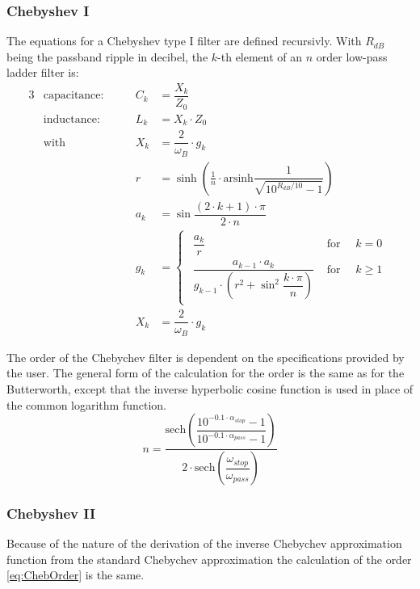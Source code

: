 \subsubsection{Chebyshev I}

The equations for a Chebyshev type I filter are defined recursivly.
With $R_{dB}$ being the passband ripple in decibel, the $k$-th
element of an $n$ order low-pass ladder filter is:
\begin{alignat}{3}
 & \text{capacitance:} \qquad & C_k & = \dfrac{X_k}{Z_0} \\
 & \text{inductance:}  \qquad & L_k & = X_k \cdot Z_0 \\
 & \text{with}         \qquad & X_k & = \dfrac{2}{\omega_B}\cdot g_k \\
 & & r   & = \sinh\left( \frac{1}{n}\cdot\text{arsinh}\dfrac{1}{\sqrt{10^{R_{dB}/10} - 1}} \right) \\
 & & a_k & = \sin \dfrac{(2\cdot k + 1)\cdot\pi}{2\cdot n} \\
 & & g_k & =
\begin{cases}
\begin{array}{ll}
  \dfrac{a_k}{r} & \textrm{ for } \quad k=0\\
  \dfrac{a_{k-1}\cdot a_k}{g_{k-1}\cdot \left( r^2 + \sin^2\dfrac{k\cdot\pi}{n} \right)} & \textrm{ for } \quad k\ge 1
\end{array}
\end{cases} \\
 & & X_k & = \dfrac{2}{\omega_B}\cdot g_k
\end{alignat}

The order of the Chebychev filter is dependent on the specifications
provided by the user.  The general form of the calculation for the
order is the same as for the Butterworth, except that the inverse
hyperbolic cosine function is used in place of the common logarithm
function.
\begin{equation}
\label{eq:ChebOrder}
n = \dfrac{\textrm{sech}\left(\dfrac{10^{-0.1\cdot \alpha_{stop}} - 1}{10^{-0.1\cdot \alpha_{pass}} - 1}\right)}{2\cdot\textrm{sech}\left(\dfrac{\omega_{stop}}{\omega_{pass}}\right)}
\end{equation}

\subsubsection{Chebyshev II}

Because of the nature of the derivation of the inverse Chebychev approximation function from the standard Chebychev approximation the calculation of the order \eqref{eq:ChebOrder} is the same.

